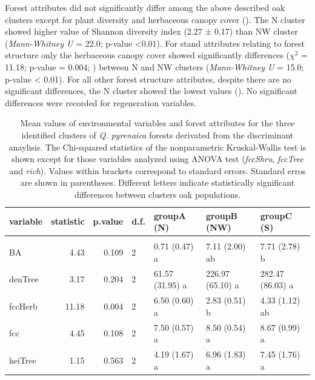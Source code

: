 Forest attributes did not significantly differ among the above described oak clusters except for plant diversity and herbaceous canopy cover (). The N cluster showed higher value of Shannon diversity index (2.27 ± 0.17) than NW cluster (\emph{Mann-Whitney U} = 22.0; p-value \textless0.01). For stand attributes relating to forest structure only the herbaceous canopy cover showed significantly differences (\(\chi^2\) = 11.18; p-value = 0.004; ) between N and NW clusters (\emph{Mann-Whitney U} = 15.0; p-value \textless{} 0.01). For all other forest structure attributes, despite there are no significant differences, the N cluster showed the lowest values (). No significant differences were recorded for regeneration variables.

\begin{table}
\caption{Mean values of environmental variables and forest attributes for the three identified clusters of \textit{Q. pyrenaica} forests derivated from the discriminant anaylisis. The Chi-squared statistics of the nonparametric Kruskal-Wallis test is shown except for those variables analyzed using ANOVA test (\textit{fccShru}, \textit{fccTree} and \textit{rich}). Values within brackets correspond to standard errors. Standard erros are shown in parentheses. Different letters indicate statistically significant differences between clusters oak populations.}\label{tab:tanovas}
\centering\begingroup\fontsize{7}{9}\selectfont
\begin{tabular}{lrrllll}
\toprule
\textbf{variable} & \textbf{statistic} & \textbf{p.value} & \textbf{d.f.} & \textbf{groupA (N)} & \textbf{groupB (NW)} & \textbf{groupC (S)}\\
\midrule
\addlinespace[0.3em]
\multicolumn{7}{l}{\textbf{Forest attributes}}\\
\hspace{1em}BA & 4.43 & 0.109 & 2 & 0.71 (0.47) a & 7.11 (2.00) ab & 7.71 (2.78) b\\
\hspace{1em}denTree & 3.17 & 0.204 & 2 & 61.57 (31.95) a & 226.97 (65.10) a & 282.47 (86.03) a\\
\hspace{1em}fccHerb & 11.18 & 0.004 & 2 & 6.50 (0.60) a & 2.83 (0.51) b & 4.33 (1.12) ab\\
\hspace{1em}fcc & 4.45 & 0.108 & 2 & 7.50 (0.57) a & 8.50 (0.54) a & 8.67 (0.99) a\\
\hspace{1em}heiTree & 1.15 & 0.563 & 2 & 4.19 (1.67) a & 6.96 (1.83) a & 7.45 (1.76) a\\

\end{tabular}
\end{table}
